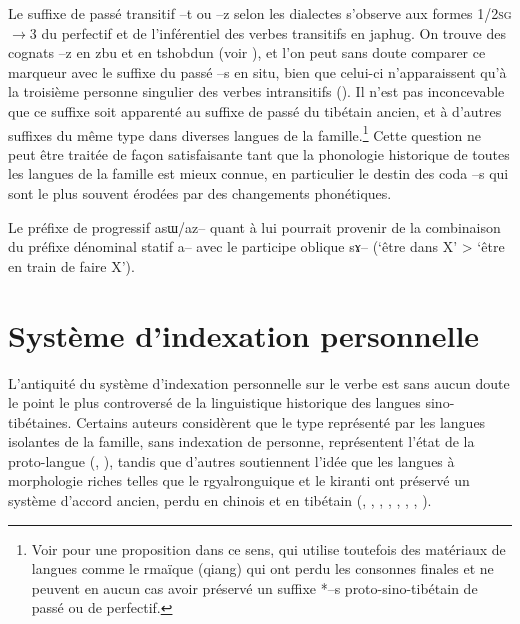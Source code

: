 \documentclass[oldfontcommands,oneside,a4paper,11pt]{article}
\newcommand{\ipa}[1]{{\phon \mbox{#1}}} %
\begin{document}
Le suffixe de passé transitif \ipa{--t} ou \ipa{--z} selon les dialectes s'observe aux formes \textsc{1/2sg}$\rightarrow$3 du perfectif et de l'inférentiel  des verbes transitifs en japhug. On trouve des cognats \ipa{--z} en zbu et en tshobdun (voir \citealt{jackson14morpho}), et l'on peut sans doute comparer ce marqueur avec le suffixe du passé \ipa{--s} en situ, bien que celui-ci n'apparaissent qu'à la troisième personne singulier des verbes intransitifs (\citealt{linyj03tense}). Il n'est pas inconcevable que ce suffixe soit apparenté au suffixe de passé du tibétain ancien, et à d'autres suffixes du même type dans diverses langues de la famille.\footnote{Voir \citet{huangbf97s.houzhui} pour une proposition dans ce sens, qui utilise toutefois des matériaux de langues comme le rmaïque (qiang) qui ont perdu les consonnes finales et ne peuvent en aucun cas avoir préservé un suffixe *--s proto-sino-tibétain de passé ou de perfectif.} Cette question ne peut être traitée de façon satisfaisante tant que la phonologie historique de toutes les langues de la famille est mieux connue, en particulier le destin des coda --s qui sont le plus souvent érodées par des changements phonétiques.

Le préfixe de progressif \ipa{asɯ/az--} quant à lui pourrait provenir de la combinaison du préfixe dénominal statif \ipa{a--} avec le participe oblique \ipa{sɤ--} (`être dans X' >  `être en train de faire X').

\section{Système d'indexation personnelle}

L'antiquité du système d'indexation personnelle sur le verbe est sans aucun doute le point le plus controversé de la linguistique historique des langues sino-tibétaines. Certains auteurs considèrent que le type représenté par les langues isolantes de la famille, sans indexation de personne, représentent l'état de la proto-langue (\citealt{lapolla92}, \citealt{lapolla03, lapolla12comments}), tandis que d'autres soutiennent l'idée que les langues à morphologie riches telles que le rgyalronguique et le kiranti ont préservé un système d'accord ancien, perdu en chinois et en tibétain (\citealt{bauman75}, \citealt{driem93agreement}, \citealt{delancey89agreement}, \citealt{delancey10agreement}, \citealt{delancey11prefixes},  \citealt{delancey14second}, \citealt{jacques10zos}, \citealt{jacques12agreement}).
   
\end{document}
